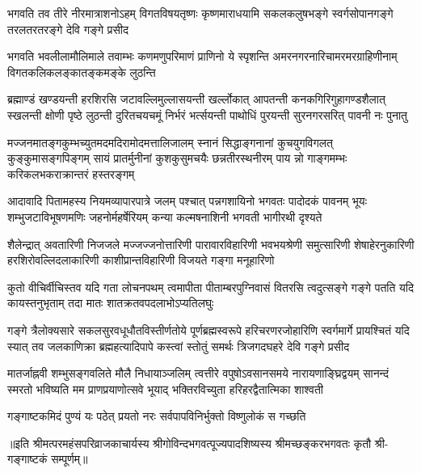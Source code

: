 

\fourlineindentedshloka
{भगवति तव तीरे नीरमात्राशनोऽहम्}
{विगतविषयतृष्णः कृष्णमाराधयामि}
{सकलकलुषभङ्गे स्वर्गसोपानगङ्गे}
{तरलतरतरङ्गे देवि गङ्गे प्रसीद}%

\fourlineindentedshloka
{भगवति भवलीलामौलिमाले तवाम्भः}
{कणमणुपरिमाणं प्राणिनो ये स्पृशन्ति}
{अमरनगरनारिचामरमरग्राहिणीनाम्}
{विगतकलिकलङ्कातङ्कमङ्के लुठन्ति}%

\fourlineindentedshloka
{ब्रह्माण्डं खण्डयन्ती हरशिरसि जटावल्लिमुल्लासयन्ती}
{खर्ल्लोकात् आपतन्ती कनकगिरिगुहागण्डशैलात् स्खलन्ती}
{क्षोणी पृष्ठे लुठन्ती दुरितचयचमूं निर्भरं भर्त्सयन्ती}
{पाथोधिं पुरयन्ती सुरनगरसरित् पावनी नः पुनातु}%

\fourlineindentedshloka
{मज्जनमातङ्गकुम्भच्युतमदमदिरामोदमत्तालिजालम्}
{स्नानं सिद्धाङ्गनानां कुचयुगविगलत् कुङ्कुमासङ्गपिङ्गम्}
{सायं प्रातर्मुनीनां कुशकुसुमचयैः छन्नतीरस्थनीरम्}
{पाय न्नो गाङ्गमम्भः करिकलभकराक्रान्तरं हस्तरङ्गम्}%

\fourlineindentedshloka
{आदावादि पितामहस्य नियमव्यापारपात्रे जलम्}
{पश्चात् पन्नगशायिनो भगवतः पादोदकं पावनम्}
{भूयः शम्भुजटाविभूषणमणिः जहनोर्महर्षेरियम्}
{कन्या कल्मषनाशिनी भगवती भागीरथी दृश्यते}%

\fourlineindentedshloka
{शैलेन्द्रात् अवतारिणी निजजले मज्जज्जनोत्तारिणी}
{पारावारविहारिणी भवभयश्रेणी समुत्सारिणी}
{शेषाहेरनुकारिणी हरशिरोवल्लिदलाकारिणी}
{काशीप्रान्तविहारिणी विजयते गङ्गा मनूहारिणो}%

\fourlineindentedshloka
{कुतो वीचिर्वीचिस्तव यदि गता लोचनपथम्}
{त्वमापीता पीताम्बरपुग्निवासं वितरसि}
{त्वदुत्सङ्गे गङ्गे पतति यदि कायस्तनुभृताम्}
{तदा मातः शातक्रतवपदलाभोऽप्यतिलघुः}%

\fourlineindentedshloka
{गङ्गे त्रैलोक्यसारे सकलसुरवधूधौतविस्तीर्णतोये}
{पूर्णब्रह्मस्वरूपे हरिचरणरजोहारिणि स्वर्गमार्गे}
{प्रायश्चितं यदि स्यात् तव जलकाणिक्रा ब्रह्महत्यादिपापे}
{कस्त्वां स्तोतुं समर्थः त्रिजगदघहरे देवि गङ्गे प्रसीद}%

\fourlineindentedshloka
{मातर्जाह्नवी शम्भुसङ्गवलिते मौलै निधायाञ्जलिम्}
{त्वत्तीरे वपुषोऽवसानसमये नारायणाङ्घ्रिद्वयम्}
{सानन्दं स्मरतो भविष्यति मम प्राणप्रयाणोत्सवे}
{भूयाद् भक्तिरविच्युता हरिहरद्वैतात्मिका शाश्वती}%

\twolineshloka
{गङ्गाष्टकमिदं पुण्यं यः पठेत् प्रयतो नरः}
{सर्वपापविनिर्भुक्तो विष्णुलोकं स गच्छति}%


॥इति श्रीमत्परमहंसपरिव्राजकाचार्यस्य श्रीगोविन्दभगवत्पूज्यपादशिष्यस्य 
श्रीमच्छङ्करभगवतः कृतौ श्री-गङ्गाष्टकं सम्पूर्णम्॥